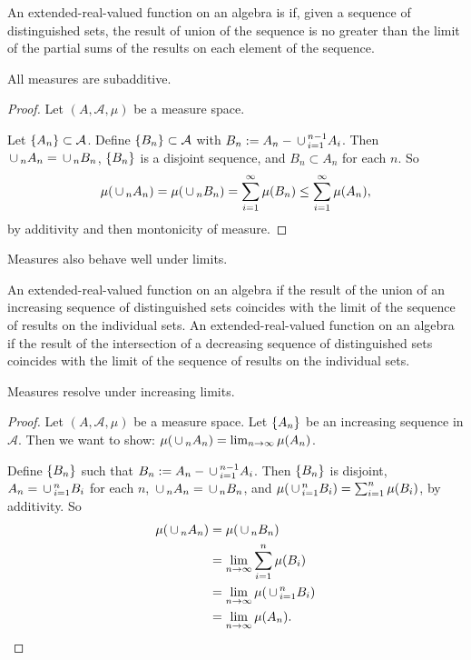 An extended-real-valued function on an algebra is
if, given a sequence of distinguished sets, the
result of union of the sequence is no greater than
the limit of the partial sums of the results on
each element of the sequence.

\begin{prop}
  All measures are subadditive.
  \begin{proof}
    Let $(A, \mathcal{A}, \mu)$ be a measure space.

    Let $\{A_n\} \subset \mathcal{A}$.
    Define $\{B_n\} \subset \mathcal{A}$
    with $B_n := A_n - \,\cup\,_{i = 1}^{n-1} A_i$.
    Then
    $\,\cup\,_n A_n = \,\cup\,_n B_n$,
    $\{B_n\}$ is a disjoint sequence, and
    $B_n \subset A_n$ for each $n$.
    So
    \[
      \mu(\,\cup\,_{n} A_n) = \mu(\,\cup\,_{n} B_n) = \sum_{i = 1}^{\infty} \mu(B_n) \leq \sum_{i = 1}^{\infty} \mu(A_n),
    \]
    by additivity and then montonicity of measure.
  \end{proof}

\end{prop}

Measures also behave well under limits.

An extended-real-valued function on an algebra
if the result of the union of an increasing sequence
of distinguished sets coincides with the
limit of the sequence of results on the individual
sets.
An extended-real-valued function on an algebra
if the result of the intersection of a decreasing sequence
of distinguished sets coincides with the
limit of the sequence of results on the individual
sets.


\begin{prop}
  Measures resolve under increasing limits.
  \begin{proof}
    Let $(A, \mathcal{A}, \mu)$ be
    a measure space.
    Let $\{A_n\}$
    be an increasing sequence in $\mathcal{A}$.
    Then we want to show:
    $\mu(\,\cup\,_{n} A_n) = \lim_{n \to \infty} \mu(A_n)$.

    Define $\{B_n\}$ such that
    $B_n := A_n - \,\cup\,_{i = 1}^{n-1} A_i$.
    Then
    $\{B_n\}$ is disjoint,
    $A_n = \,\cup\,_{i = 1}^{n} B_i$ for
    each $n$,
    $\,\cup\,_n A_n = \,\cup\,_n B_n$, and
    $\mu(\,\cup\,_{i = 1}^{n} B_i)
    = \sum_{i = 1}^{n} \mu(B_i)$,
    by additivity.
    So
    \[
      \begin{aligned}
        \mu(\,\cup\,_n A_n)
        &= \mu(\,\cup\,_n B_n) \\
        &= \lim_{n \to \infty} \sum_{i = 1}^{n} \mu(B_i) \\
        &= \lim_{n \to \infty} \mu(\,\cup\,_{i = 1}^{n} B_i) \\
        &= \lim_{n \to \infty} \mu(A_n).
      \end{aligned}
    \]
  \end{proof}
\end{prop}

